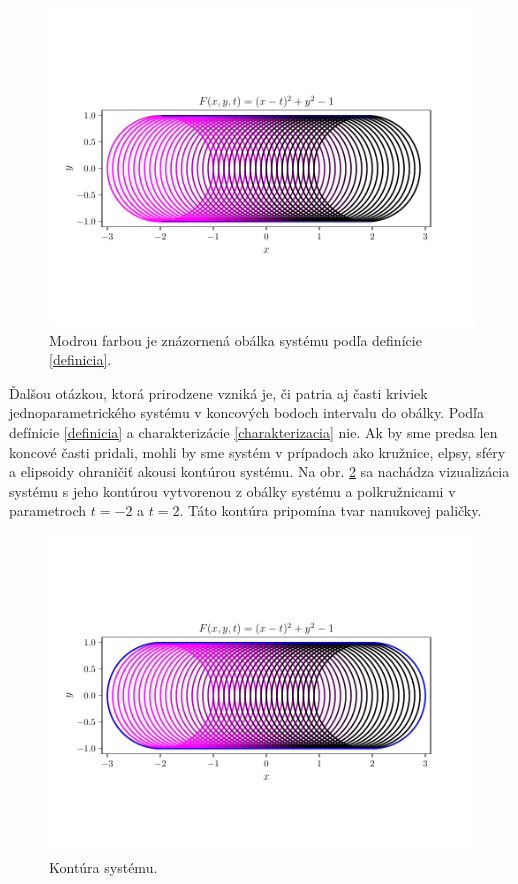 \begin{figure}[h]
	\centering
	\includegraphics[trim={0.5cm 2.8cm 0.5cm 3.3cm},clip]{images/system_with_correct_envelope.pdf}
	\caption[Obálka systému podľa definície.]{Modrou farbou je znázornená obálka systému podľa definície \ref{definicia}.}
	\label{fig:system_with_correct_envelope}
\end{figure}

Ďalšou otázkou, ktorá prirodzene vzniká je, či patria aj časti kriviek jednoparametrického systému v koncových bodoch intervalu do obálky. Podľa defínicie \ref{definicia} a charakterizácie \ref{charakterizacia} nie. Ak by sme predsa len koncové časti pridali, mohli by sme systém v prípadoch ako kružnice, elpsy, sféry a elipsoidy ohraničiť akousi kontúrou systému. Na obr. \ref{fig:nanuk} sa nachádza vizualizácia systému s jeho kontúrou vytvorenou z obálky systému a polkružnicami v parametroch $t=-2$ a $t=2.$ Táto kontúra pripomína tvar nanukovej paličky.

\begin{figure}[H]
	\centering
	\includegraphics[trim={0.5cm 2.8cm 0.5cm 3.3cm},clip]{images/nanuk.pdf}
	\caption{Kontúra systému.}
	\label{fig:nanuk}
\end{figure}


